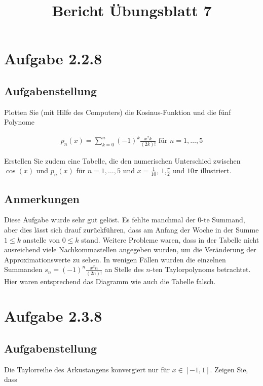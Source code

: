 \documentclass[a4paper]{article}
\title{Bericht Übungsblatt 7}
\date{}
\author{}
\begin{document}
\maketitle

\section{Aufgabe 2.2.8}

\subsection{Aufgabenstellung}

Plotten Sie (mit Hilfe des Computers) die Kosinus-Funktion und die fünf Polynome

\begin{align*}
  p_n(x) = \sum_{k=0}^n (-1)^k \frac{x^2k}{(2k)!} \text{ für } n=1,\ldots,5
\end{align*}

Erstellen Sie zudem eine Tabelle, die den numerischen Unterschied zwischen $\cos(x)$ und $p_n(x)$ für $n=1,\ldots,5$ und $x=\frac{1}{10}$, $1$,$\frac{\pi}{2}$ und $10\pi$ illustriert.

\subsection{Anmerkungen}

Diese Aufgabe wurde sehr gut gelöst. Es fehlte manchmal der 0-te Summand, aber dies lässt sich drauf zurückführen, dass am Anfang der Woche in der Summe $1\le k$ anstelle von $0\le k$ stand. Weitere Probleme waren, dass in der Tabelle nicht ausreichend viele Nachkommastellen angegeben wurden, um die Veränderung der Approximationswerte zu sehen. In wenigen Fällen wurden die einzelnen Summanden $s_n = (-1)^n \frac{x^2n}{(2n)!}$ an Stelle des $n$-ten Taylorpolynoms betrachtet. Hier waren entsprechend das Diagramm wie auch die Tabelle falsch.

\section{Aufgabe 2.3.8}

\subsection{Aufgabenstellung}

Die Taylorreihe des Arkustangens konvergiert nur für $x\in[-1,1]$. Zeigen Sie, dass 
\end{document}
